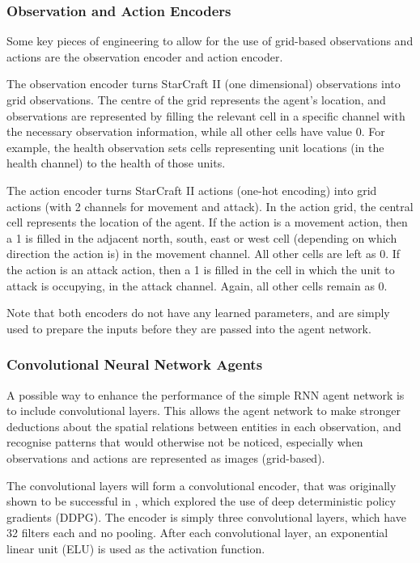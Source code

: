 \subsubsection{Observation and Action Encoders}

Some key pieces of engineering to allow for the use of grid-based observations and actions are the observation encoder and action encoder. 

The observation encoder turns StarCraft II (one dimensional) observations into grid observations. The centre of the grid represents the agent's location, and observations are represented by filling the relevant cell in a specific channel with the necessary observation information, while all other cells have value 0. For example, the health observation sets cells representing unit locations (in the health channel) to the health of those units. 

The action encoder turns StarCraft II actions (one-hot encoding) into grid actions (with 2 channels for movement and attack). In the action grid, the central cell represents the location of the agent. If the action is a movement action, then a 1 is filled in the adjacent north, south, east or west cell (depending on which direction the action is) in the movement channel. All other cells are left as 0. If the action is an attack action, then a 1 is filled in the cell in which the unit to attack is occupying, in the attack channel. Again, all other cells remain as 0. 



Note that both encoders do not have any learned parameters, and are simply used to prepare the inputs before they are passed into the agent network.

\subsubsection{Convolutional Neural Network Agents}

A possible way to enhance the performance of the simple RNN agent network is to include convolutional layers. This allows the agent network to make stronger deductions about the spatial relations between entities in each observation, and recognise patterns that would otherwise not be noticed, especially when observations and actions are represented as images (grid-based). 

The convolutional layers will form a convolutional encoder, that was originally shown to be successful in \cite{ddpg}, which explored the use of deep deterministic policy gradients (DDPG). The encoder is simply three convolutional layers, which have 32 filters each and no pooling. After each convolutional layer, an exponential linear unit (ELU) is used as the activation function.

